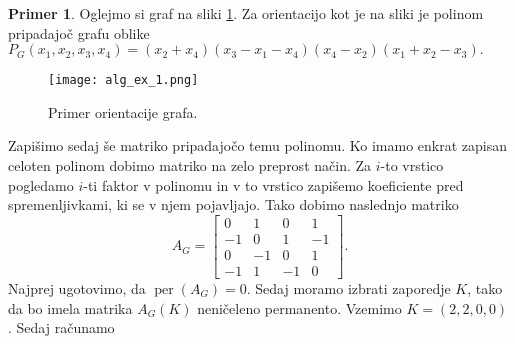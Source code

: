 \documentclass[12pt,a4paper,twoside]{article}
\theoremstyle{definition} %
\newtheorem{primer}[definicija]{Primer}
\theoremstyle{plain} %
\numberwithin{equation}{section}  %
\DeclareMathOperator{\per}{per}
\begin{document}
\begin{primer}

Oglejmo si graf na sliki \ref{ex_1}. Za orientacijo kot je na sliki je polinom pripadajoč grafu oblike $P_G(x_1, x_2, x_3, x_4) =(x_2 + x_4)(x_3 - x_1 - x_4)(x_4 - x_2)(x_1 + x_2 - x_3). $
 \begin{figure}[h!]
\caption{Primer orientacije grafa.}
\label{ex_1}
\centering
    \texttt{[image: alg\_ex\_1.png]}
    \end{figure}
Zapišimo sedaj še matriko pripadajočo temu polinomu. Ko imamo enkrat zapisan celoten polinom dobimo matriko na zelo preprost način. Za $i$-to vrstico pogledamo $i$-ti faktor v polinomu in v to vrstico zapišemo koeficiente pred spremenljivkami, ki se v njem pojavljajo. Tako dobimo naslednjo matriko 
$$ A_G = \left[ \begin{matrix} 0 & 1 & 0 & 1 \\ -1 & 0 & 1 & -1 \\ 0 & -1 & 0 & 1 \\ -1 & 1 & -1 & 0 \end{matrix} \right] .$$
 Najprej ugotovimo, da $\per(A_G) = 0$. Sedaj moramo izbrati zaporedje $K$, tako da bo imela matrika $A_G(K)$ neničeleno permanento. Vzemimo $K = (2,2,0,0)$. Sedaj računamo 


\end{primer}
\end{document}
